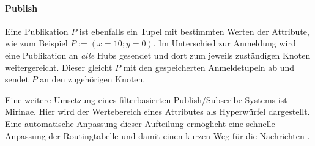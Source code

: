 \paragraph{Publish}
Eine Publikation $P$ ist ebenfalls ein Tupel mit bestimmten Werten der Attribute, wie zum Beispiel $P := (x = 10; y = 0)$. Im Unterschied zur Anmeldung wird eine Publikation an \emph{alle} Hubs gesendet und dort zum jeweils zuständigen Knoten weitergereicht. Dieser gleicht $P$ mit den gespeicherten Anmeldetupeln ab und sendet $P$ an den zugehörigen Knoten.

Eine weitere Umsetzung eines filterbasierten Publish/Subscribe-Systems ist Mirinae. Hier wird der Wertebereich eines Attributes als Hyperwürfel dargestellt. Eine automatische Anpassung dieser Aufteilung ermöglicht eine schnelle Anpassung der Routingtabelle und damit einen kurzen Weg für die Nachrichten \cite{Choi2005Mirinae}.
